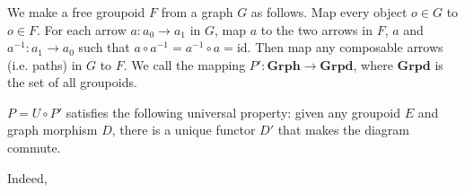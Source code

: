 \documentclass[luatex]{article}
\begin{document}
\subsubsection{}

\showArt

We make a free groupoid $F$ from a graph $G$ as follows. Map every object $o \in G$ to $o \in F$. For each arrow $a : a_0 \rightarrow a_1$ in $G$, map $a$ to the two arrows in $F$, $a$ and $a^{-1} : a_1 \rightarrow a_0$ such that $a \circ a^{-1} = a^{-1} \circ a = \mathrm{id}$. Then map any composable arrows (i.e. paths) in $G$ to $F$. We call the mapping $P' : \mathbf{Grph} \rightarrow \mathbf{Grpd}$, where $\mathbf{Grpd}$ is the set of all groupoids.

$P = U \circ P'$ satisfies the following universal property: given any groupoid $E$ and graph morphism $D$, there is a unique functor $D'$ that makes the diagram commute.

\begin{center}
\end{center}

Indeed, 

\subsection{}

\section{}

\section{}

\section{}

\section{}

\section{}
\end{document}
